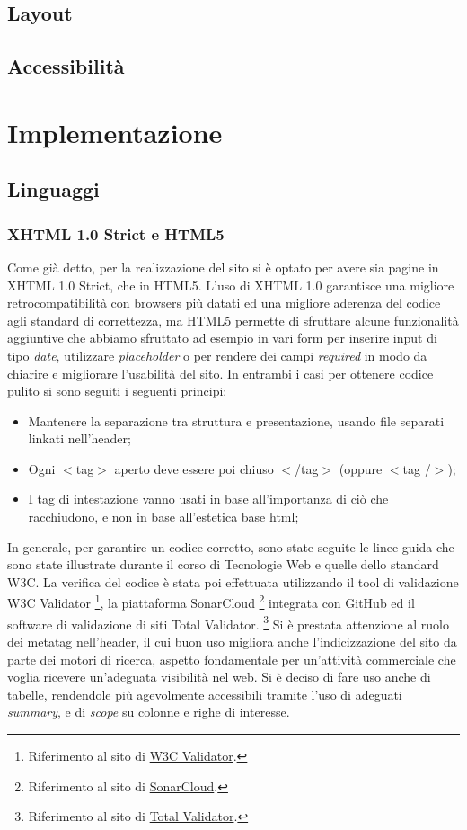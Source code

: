 \documentclass{article}
\begin{document}
		\subsection{Layout}
		\subsection{Accessibilità}
	\section{Implementazione}
		\subsection{Linguaggi}
			\subsubsection{XHTML 1.0 Strict e HTML5}
			Come già detto, per la realizzazione del sito si è optato per avere sia pagine in XHTML 1.0 Strict, che in HTML5. L'uso di XHTML 1.0 garantisce una migliore retrocompatibilità con browsers più datati ed una migliore aderenza del codice agli standard di correttezza, ma HTML5 permette di sfruttare alcune funzionalità aggiuntive che abbiamo sfruttato ad esempio in vari form per inserire input di tipo \textit{date}, utilizzare \textit{placeholder} o per rendere dei campi \textit{required} in modo da chiarire e migliorare l'usabilità del sito. In entrambi i casi per ottenere codice pulito si sono seguiti i seguenti principi:
			\begin{itemize}
			    \item Mantenere la separazione tra struttura e presentazione, usando file separati linkati nell'header;
			    \item Ogni $<$tag$>$ aperto deve essere poi chiuso $<$/tag$>$ (oppure $<$tag /$>$);
			    \item I tag di intestazione vanno usati in base all'importanza di ciò che racchiudono, e non in base all'estetica base html;
			\end{itemize}
			\newline In generale, per garantire un codice corretto, sono state seguite le linee guida che sono state illustrate durante il corso di Tecnologie Web e quelle dello standard W3C. La verifica del codice è stata poi effettuata  utilizzando il tool di validazione W3C Validator%
			\footnote{Riferimento al sito di  \href{https://validator.w3.org/}{W3C Validator}.},
			 la piattaforma SonarCloud%
			\footnote{Riferimento al sito di  \href{https://sonarcloud.io/about}{SonarCloud}.}
			 integrata con GitHub
			ed il software di validazione di siti Total Validator.%
			\footnote{Riferimento al sito di  \href{https://www.totalvalidator.com/}{Total Validator}.}
			\newline Si è prestata attenzione al ruolo dei metatag nell'header, il cui buon uso migliora anche l'indicizzazione del sito da parte dei motori di ricerca, aspetto fondamentale per un'attività commerciale che voglia ricevere un'adeguata visibilità nel web.
			\newline Si è deciso di fare uso anche di tabelle, rendendole più agevolmente accessibili tramite l'uso di adeguati \textit{summary}, e di \textit{scope} su colonne e righe di interesse.
\end{document}
